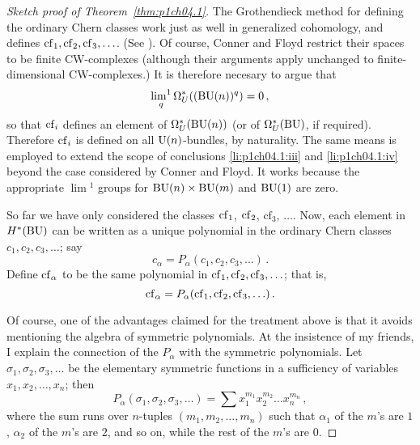 \documentclass[../main]{subfiles}
\begin{document}
\begin{proof}[Sketch proof of Theorem~\ref{thm:p1ch04.1}]
The Grothendieck method for defining the ordinary Chern classes work just as well in generalized cohomology, and defines $\mathrm{cf}_1, \mathrm{cf}_2, \mathrm{cf}_3, \ldots$. 
(See \cite{connerfloyd}). 
Of course, Conner and Floyd restrict their spaces to be finite CW-complexes (although their arguments apply unchanged to finite-dimensional CW-complexes.) 
It is therefore necesary to argue that 
\begin{equation*}
	\mathop{\mathrm{lim}^1}_q \Omega_U^\ast ((\mathrm{BU}(n))^q) = 0\,,
\end{equation*}
so that $\mathrm{cf}_i$ defines an element of $\Omega_U^\ast(\mathrm{BU}(n))$ (or of $\Omega_U^\ast(\operatorname{BU})$, if required). 
Therefore $\mathrm{cf}_i$ is defined on all $\mathrm{U}(n)$-bundles, by naturality. 
The same means is employed to extend the scope of conclusions \ref{li:p1ch04.1:iii} and \ref{li:p1ch04.1:iv} beyond the case considered by Conner and Floyd.
It works because the appropriate $\lim\!^1$ groups for $\mathrm{BU}(n) \times \mathrm{BU}(m)$ and $\mathrm{BU}(1)$ are zero.

So far we have only considered the classes $\mathrm{cf}_1$, $\mathrm{cf}_2$, $\mathrm {cf}_3$, $\ldots$. 
Now, each element in $H^\ast(\operatorname{BU})$ can be written as a unique polynomial in the ordinary Chern classes $c_1, c_2, c_3, \ldots$; 
say 
\begin{equation*}
	c_\alpha = P_\alpha(c_1, c_2, c_3, \ldots)\,.
\end{equation*} 
Define $\mathrm{cf}_\alpha$ to be the same polynomial in $\mathrm{cf}_1, \mathrm{cf}_2, \mathrm{cf}_3, \ldots$; 
that is, 
\begin{equation*}
	\mathrm{cf}_\alpha = P_\alpha(\mathrm{cf}_1, \mathrm{cf}_2, \mathrm{cf}_3, \ldots)\,.
\end{equation*} 

Of course, one of the advantages claimed for the treatment above is that it avoids mentioning the algebra of symmetric polynomials. 
At the insistence of my friends, I explain the connection of the $P_\alpha$ with the symmetric polynomials. 
Let $\sigma_1, \sigma_2, \sigma_3, \ldots$ be the elementary symmetric functions in a sufficiency of variables $x_1, x_2, \ldots, x_n$; 
then 
\begin{equation*}
	P_\alpha(\sigma_1, \sigma_2 ,\sigma_3, \ldots) = \sum x_1^{m_1} x_2^{m_2} \ldots x_n^{m_n}\, ,
\end{equation*} 
where the sum runs over $n$-tuples $(m_1, m_2, \ldots, m_n)$ such that $\alpha_1$ of the $m$'s are $1$, $\alpha_2$ of the $m$'s are $2$, and so on, while the rest of the $m$'s are $0$.


\end{proof}
\end{document}
